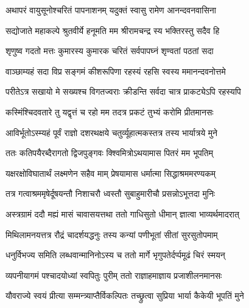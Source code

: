 

\translink{}

\storymeta



\twolineshloka
{अथापरं वायुसूनोश्चरितं पापनाशनम्}
{यदुक्तं स्वासु रामेण आनन्दवनवासिना}%

\twolineshloka
{सद्योजाते महाकल्पे श्रुतवीर्ये हनूमति}
{मम श्रीरामचन्द्र स्य भक्तिरस्तु सदैव हि}%

\twolineshloka
{शृणुष्व गदतो मत्तः कुमारस्य कुमारक}
{चरितं सर्वपापघ्नं शृण्वतां पठतां सदा}%

\twolineshloka
{वाञ्छाम्यहं सदा विप्र सङ्गमं कीशरूपिणा}
{रहस्यं रहसि स्वस्य ममानन्दवनोत्तमे}%

\twolineshloka
{परीतेऽत्र सखायो मे सख्यश्च विगतज्वराः}
{क्रीडन्ति सर्वदा चात्र प्राकट्येऽपि रहस्यपि}%

\twolineshloka
{कस्मिंश्चिदवतारे तु यद्वृत्तं च रहो मम}
{तदत्र प्रकटं तुभ्यं करोमि प्रीतमानसः}%

\twolineshloka
{आविर्भूतोऽस्म्यहं पूर्वं राज्ञो दशरथक्षये}
{चतुर्व्यूहात्मकस्तत्र तस्य भार्यात्रये मुने}%

\twolineshloka
{ततः कतिपयैरब्दैरागतो द्विजपुङ्गवः}
{क्श्विमित्रोऽथयामास पितरं मम भूपतिम्}%

\twolineshloka
{यक्षरक्षोविघातार्थं लक्ष्मणेन सहैव माम्}
{प्रेषयामास धर्मात्मा सिद्धाश्रममरण्यकम्}%

\twolineshloka
{तत्र गत्वाश्रममृषेर्दूषयन्तौ निशाचरौ}
{ध्वस्तौ सुबाहुमारीचौ प्रसन्नोऽभूत्तदा मुनिः}%

\twolineshloka
{अस्त्रग्रामं ददौ मह्यं मासं चावासयत्तथा}
{ततो गाधिसुतो धीमान् ज्ञात्वा भाव्यर्थमादरात्}%

\twolineshloka
{मिथिलामनयत्तत्र रौद्रं चादर्शयद्धनुः}
{तस्य कन्यां पणीभूतां सीतां सुरसुतोपमाम्}%

\twolineshloka
{धनुर्विभज्य समिति लब्धवान्मानिनोऽस्य च}
{ततो मार्गे भृगुपतेर्दर्प्पमूढं चिरं स्मयन्}%

\twolineshloka
{व्यपनीयागमं पश्चादयोध्यां स्वपितुः पुरीम्}
{ततो राज्ञाहमाज्ञाय प्रजाशीलनमानसः}%

\twolineshloka
{यौवराज्ये स्वयं प्रीत्या सम्मन्त्र्याप्तैर्विकल्पितः}
{तच्छ्रुत्वा सुप्रिया भार्या कैकेयी भूपतिं मुने}%

